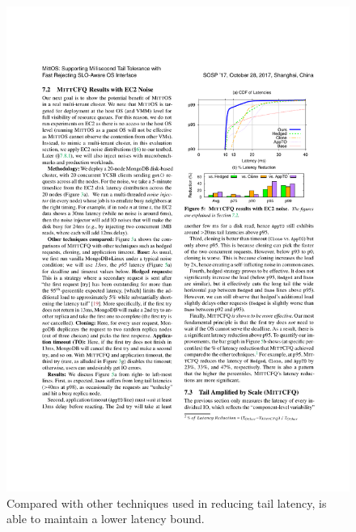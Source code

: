 \begin{figure}
  \centering
  \includegraphics[width=0.95\columnwidth]{figures/runtime-mock.pdf}
  \caption{Compared with other techniques used in reducing tail latency,
    \sysname{} is able to maintain a lower latency bound.}
  \label{fig:eval-runtime}
\end{figure}

